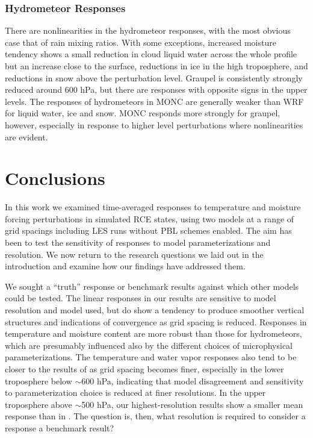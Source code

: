 \documentclass[draft]{agujournal2019}
\begin{document}
\subsubsection{Hydrometeor Responses}

There are nonlinearities in the hydrometeor responses, with the most obvious
case that of rain mixing ratios. With some exceptions, increased moisture
tendency shows a small reduction in cloud liquid water across the whole profile
but an increase close to the surface, reductions in ice in the high troposphere,
and reductions in snow above the perturbation level. Graupel is consistently
strongly reduced around 600 hPa, but there are responses with opposite signs in
the upper levels. The responses of hydrometeors in MONC are generally weaker
than WRF for liquid water, ice and snow. MONC responds more strongly for
graupel, however, especially in response to higher level perturbations where
nonlinearities are evident.

\section{Conclusions}
\label{sec:conclusions}

In this work we examined time-averaged responses to temperature and moisture forcing
perturbations in simulated RCE states, using two models at a range of grid
spacings including LES runs without PBL schemes enabled. The aim has been to test
the sensitivity of responses to model parameterizations and resolution. We now
return to the research questions we laid out in the introduction and examine how
our findings have addressed them.

We sought a ``truth'' response or benchmark results against which other models
could be tested. The linear responses in our results are sensitive to model
resolution and model used, but do show a tendency to produce smoother vertical structures and indications of
convergence as grid spacing is reduced. Responses in temperature and moisture
content are more robust than those for hydrometeors, which are presumably influenced also by the different choices of microphysical parameterizations. The temperature and water
vapor responses also tend to be closer to the results of 
as grid spacing becomes finer, especially in the lower troposphere below
$\sim$600 hPa, indicating that model disagreement and sensitivity to
parameterization choice is reduced at finer resolutions. In the upper
troposphere above $\sim$500 hPa, our highest-resolution results show a smaller
mean response than in . The question is, then, what
resolution is required to consider a response a benchmark result?
\end{document}

